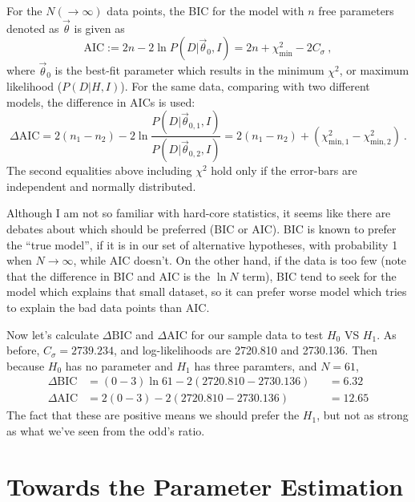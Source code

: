 \begin{thm}
For the $ N (\rightarrow \infty) $ data points, the BIC for the model with $ n $ free parameters denoted as $ \vec{\theta} $ is given as
\begin{equation}\label{eq: aic}
  \mathrm{AIC} := 2n - 2 \ln P(D|\vec{\theta}_0, I) = 2n + \chi^2_\mathrm{min} - 2C_\sigma ~,
\end{equation}
where $ \vec{\theta}_0 $ is the best-fit parameter which results in the minimum $ \chi^2 $, or maximum likelihood ($ P(D|H, I) $). 
For the same data, comparing with two different models, the difference in AICs is used:
\begin{equation}\label{eq: daic}
  \Delta \mathrm{AIC} 
  = 2(n_1 - n_2) - 2 \ln \frac{P(D|\vec{\theta}_{0, 1}, I)}{P(D|\vec{\theta}_{0, 2}, I)}
  = 2(n_1 - n_2) + (\chi^2_\mathrm{min, 1} - \chi^2_\mathrm{min, 2}) ~.
\end{equation}
The second equalities above including $ \chi^2 $ hold only if the error-bars are independent and normally distributed.
\end{thm}

Although I am not so familiar with hard-core statistics, it seems like there are debates about which should be preferred (BIC or AIC). BIC is known to prefer the ``true model'', if it is in our set of alternative hypotheses, with probability 1 when $ N \rightarrow \infty $, while AIC doesn't. On the other hand, if the data is too few (note that the difference in BIC and AIC is the $ \ln N $ term), BIC tend to seek for the model which explains that small dataset, so it can prefer worse model which tries to explain the bad data points than AIC. 

Now let's calculate $ \Delta \mathrm{BIC} $ and $ \Delta \mathrm{AIC} $ for our sample data to test $ H_0 $ VS $ H_1 $. As before, $ C_\sigma = 2739.234 $, and log-likelihoods are 2720.810 and 2730.136. Then because $ H_0 $ has no parameter and $ H_1 $ has three paramters, and $ N = 61 $,
\begin{align*}
  \Delta \mathrm{BIC}
    &= (0 - 3) \ln 61 - 2 (2720.810 - 2730.136)
    &&= 6.32 \\
  \Delta \mathrm{AIC}
    &= 2 (0 - 3) - 2 (2720.810 - 2730.136)
    &&= 12.65
\end{align*}
The fact that these are positive means we should prefer the $ H_1 $, but not as strong as what we've seen from the odd's ratio.


\section{Towards the Parameter Estimation}

